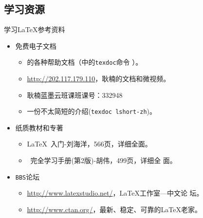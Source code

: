 \documentclass[fontset = adobe, xcolor=svgnames, t, aspectratio=169]{ctexbeamer}
\begin{document}
\subsection{学习资源}
\begin{frame}[t]{学习\LaTeX}{参考资料}
  \stretchon
  \begin{itemize}
  \item \alert{免费}电子文档
    \begin{itemize}
    \item \TeXLive 的各种帮助文档（\TeXLive 中的\alert{\texttt{texdoc}}命令
      ）。
    \item \url{http://202.117.179.110}，耿楠的文档和微视频。
    \item 耿楠蓝墨云班课班课号：332948
    \item 一份不太简短的{\LaTeXe}介绍(\texttt{texdoc lshort-zh})。
    \end{itemize}
  \item 纸质教材和专著
    \begin{itemize}
    \item {\LaTeX}~入门-刘海洋，566页，详细全面。
    \item {\LaTeXe}~完全学习手册(第2版)-胡伟，499页，详细全
      面。
    \end{itemize}
  \item \texttt{BBS}论坛
    \begin{itemize}
    \item \url{http://www.latexstudio.net/}，{\LaTeX}工作室---中文论
      坛。  
    \item \url{http://www.ctan.org/}，最新、稳定、可靠的{\LaTeX}老家。    
    \end{itemize}
  \end{itemize}
  \stretchoff
\end{frame}
\end{document}
